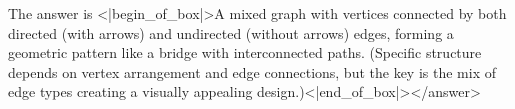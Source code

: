 The answer is <|begin_of_box|>A mixed graph with vertices connected by both directed (with arrows) and undirected (without arrows) edges, forming a geometric pattern like a bridge with interconnected paths. (Specific structure depends on vertex arrangement and edge connections, but the key is the mix of edge types creating a visually appealing design.)<|end_of_box|></answer>